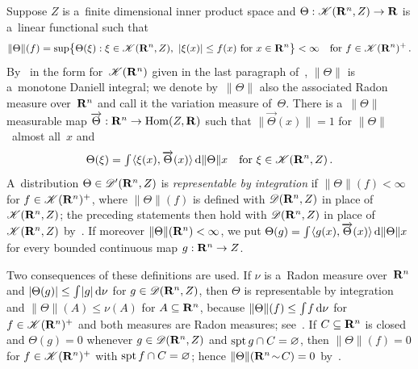 \documentclass[a4paper,twoside,leqno]{article}
\begin{document}
\begin{miniremark}
    \label{mr:functionals}
    Suppose $Z$ is a~finite dimensional inner product space and $\Theta : \mathscr{K}(\mathbf{R}^{n},Z)
    \to \mathbf{R}$ is a~linear functional such that
    \begin{displaymath}
        \|\Theta\|(f) = \sup \bigl\{ \Theta(\xi) : \xi \in \mathscr{K}(\mathbf{R}^{n},Z),\ |\xi(x)| \le
        f(x) \text{ for } x \in \mathbf{R}^{n} \bigr\} < \infty
        \quad \text{for $f \in \mathscr{K}(\mathbf{R}^{n})^+$} \,.
    \end{displaymath}
    By~\cite[2.5.12]{Federer1969} in the form for~$\mathscr{K}(\mathbf{R}^{n})$ given in the last
    paragraph of~\cite[2.5.14]{Federer1969}, $\|\Theta\|$ is a~monotone Daniell integral; we
    denote by~$\|\Theta\|$ also the associated Radon measure over~$\mathbf{R}^{n}$ and call it the
    variation measure of~$\Theta$. There is a~$\|\Theta\|$ measurable map $\overrightarrow{\Theta}
    : \mathbf{R}^{n} \to \operatorname{Hom}(Z,\mathbf{R})$ such that $\|\overrightarrow{\Theta}(x)\| = 1$ for
    $\|\Theta\|$~almost all~$x$ and
    \begin{displaymath}
        \Theta(\xi) = {\textstyle\int_{}^{}} \langle \xi(x), \overrightarrow{\Theta}(x) \rangle
        \,\mathrm{d} \|\Theta\| x
        \quad \text{for $\xi \in \mathscr{K}(\mathbf{R}^{n},Z)$} \,.
    \end{displaymath}
    A~distribution $\Theta \in \mathscr{D}'(\mathbf{R}^{n},Z)$ is \emph{representable by integration} if
    $\|\Theta\|(f) < \infty$ for $f \in \mathscr{K}(\mathbf{R}^{n})^+$, where $\|\Theta\|(f)$ is defined
    with $\mathscr{D}(\mathbf{R}^{n},Z)$ in place of~$\mathscr{K}(\mathbf{R}^{n},Z)$; the preceding statements
    then hold with $\mathscr{D}(\mathbf{R}^{n},Z)$ in place of~$\mathscr{K}(\mathbf{R}^{n},Z)$
    by~\cite[4.1.5]{Federer1969}. If moreover $\|\Theta\|(\mathbf{R}^{n}) < \infty$, we put
    $\Theta(g) = {\textstyle\int_{}^{}} \langle g(x), \overrightarrow{\Theta}(x) \rangle \,\mathrm{d} \|\Theta\| x$
    for every bounded continuous map $g : \mathbf{R}^{n} \to Z$.

    Two consequences of these definitions are used. If $\nu$ is a~Radon measure over~$\mathbf{R}^{n}$
    and $|\Theta(g)| \le {\textstyle\int_{}^{}} |g| \,\mathrm{d} \nu$ for $g \in \mathscr{D}(\mathbf{R}^{n},Z)$, then
    $\Theta$ is representable by integration and $\|\Theta\|(A) \le \nu(A)$ for $A \subseteq
    \mathbf{R}^{n}$, because $\|\Theta\|(f) \le {\textstyle\int_{}^{}} f \,\mathrm{d} \nu$ for $f \in
    \mathscr{K}(\mathbf{R}^{n})^+$ and both measures are Radon measures; see~\cite[2.5.14]{Federer1969}.
    If $C \subseteq \mathbf{R}^{n}$ is closed and $\Theta(g) = 0$ whenever $g \in
    \mathscr{D}(\mathbf{R}^{n},Z)$ and $\operatorname{spt} g \cap C = \varnothing$, then $\|\Theta\|(f) = 0$ for $f \in
    \mathscr{K}(\mathbf{R}^{n})^+$ with $\operatorname{spt} f \cap C = \varnothing$; hence $\|\Theta\|(\mathbf{R}^{n}
    \!\sim\! C) = 0$ by~\cite[2.5.14]{Federer1969}.
\end{miniremark}
\end{document}
